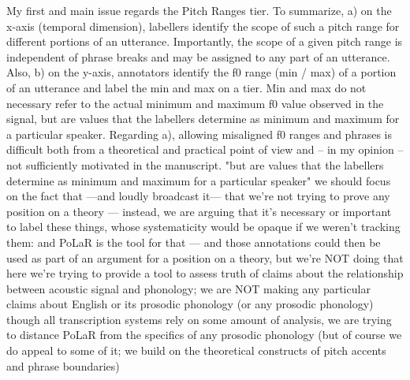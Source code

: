 \markdownRendererUlEndTight \markdownRendererUlItemEnd 
\markdownRendererUlEndTight \markdownRendererUlItemEnd 
\markdownRendererUlEndTight \markdownRendererUlItemEnd 
\markdownRendererUlEndTight \markdownRendererInterblockSeparator
{}
\markdownRendererSectionEnd \markdownRendererSectionBegin
{}\markdownRendererInterblockSeparator
{}\markdownRendererUlBeginTight
\markdownRendererUlItem My first and main issue regards the Pitch Ranges tier. To summarize, a) on the x-axis (temporal dimension), labellers identify the scope of such a pitch range for different portions of an utterance. Importantly, the scope of a given pitch range is independent of phrase breaks and may be assigned to any part of an utterance. Also, b) on the y-axis, annotators identify the f0 range (min / max) of a portion of an utterance and label the min and max on a tier. Min and max do not necessary refer to the actual minimum and maximum f0 value observed in the signal, but are values that the labellers determine as minimum and maximum for a particular speaker. Regarding a), allowing misaligned f0 ranges and phrases is difficult both from a theoretical and practical point of view and – in my opinion – not sufficiently motivated in the manuscript.\markdownRendererUlItemEnd 
\markdownRendererUlItem "but are values that the labellers determine as minimum and maximum for a particular speaker"\markdownRendererInterblockSeparator
{}\markdownRendererUlBeginTight
\markdownRendererUlItem we should focus on the fact that —and loudly broadcast it— that we're not trying to prove any position on a theory — instead, we are arguing that it's necessary or important to label these things, whose systematicity would be opaque if we weren't tracking them: and PoLaR is the tool for that — and those annotations could then be used as part of an argument for a position on a theory, but we're NOT doing that here\markdownRendererUlItemEnd 
\markdownRendererUlItem we’re trying to provide a tool to assess truth of claims about the relationship between acoustic signal and phonology; we are NOT making any particular claims about English or its prosodic phonology (or any prosodic phonology)\markdownRendererInterblockSeparator
{}\markdownRendererUlBeginTight
\markdownRendererUlItem though all transcription systems rely on some amount of analysis, we are trying to distance PoLaR from the specifics of any prosodic phonology\markdownRendererUlItemEnd 
\markdownRendererUlItem (but of course we do appeal to some of it; we build on the theoretical constructs of pitch accents and phrase boundaries)\markdownRendererUlItemEnd 

